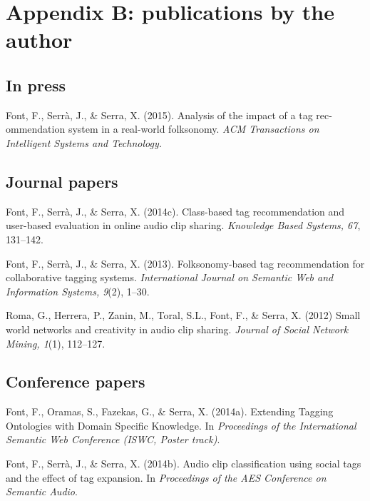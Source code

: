 
\chapter{Appendix B: publications by the author}
\label{sec:Pubs}


\section*{In press}

Font, F., Serr\`a, J., \& Serra, X. (2015). Analysis of the impact of a tag rec-
ommendation system in a real-world folksonomy. \emph{ACM Transactions on Intelligent Systems and Technology.}



\section*{Journal papers}


Font, F., Serr\`a, J., \& Serra, X. (2014c). Class-based tag recommendation and user-based evaluation in online audio clip sharing. \emph{Knowledge Based Systems, 67}, 131--142.

\vspace{0.2cm}

Font, F., Serr\`a, J., \& Serra, X. (2013). Folksonomy-based tag recommendation for collaborative tagging systems. \emph{International Journal on Semantic Web and Information Systems, 9}(2), 1--30.

\vspace{0.2cm}

Roma, G., Herrera, P., Zanin, M., Toral, S.L., Font, F., \& Serra, X. (2012) Small world networks and creativity in audio clip sharing. \emph{Journal of Social Network Mining, 1}(1), 112--127.


\section*{Conference papers}

Font, F., Oramas, S., Fazekas, G., \& Serra, X. (2014a). Extending Tagging Ontologies with Domain Specific Knowledge. In \emph{Proceedings of the International Semantic Web Conference (ISWC, Poster track)}.

\vspace{0.2cm}

Font, F., Serr\`a, J., \& Serra, X. (2014b). Audio clip classification using social tags and the effect of tag expansion. In \emph{Proceedings of the AES Conference on Semantic Audio}.

